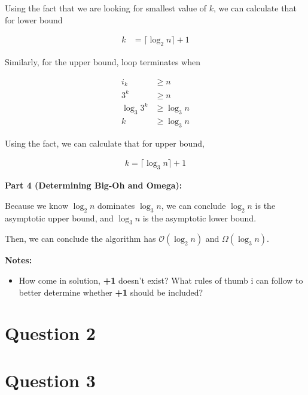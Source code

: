 \documentclass[12pt]{article}
\begin{document}
\begin{enumerate}[a.]
    \bigskip

    Using the fact that we are looking for smallest value of $k$, we can calculate that
    for lower bound

    \begin{align}
        k &= \lceil \log_2 n \rceil + 1
    \end{align}

    \bigskip

    Similarly, for the upper bound, loop terminates when

    \begin{align}
        i_k &\geq n\\
        3^k &\geq n\\
        \log_3 3^k &\geq \log_3 n\\
        k &\geq \log_3 n
    \end{align}

    \bigskip

    Using the fact, we can calculate that for upper bound,

    \begin{align}
        k = \lceil \log_3 n \rceil + 1
    \end{align}

    \textbf{Part 4 (Determining Big-Oh and Omega):}

    \bigskip

    Because we know $\log_2 n$ dominates $\log_3 n$, we can conclude
    $\log_2 n$ is the asymptotic upper bound, and $\log_3 n$ is the asymptotic lower bound.

    \bigskip

    Then, we can conclude the algorithm has $\mathcal{O}(\log_2 n)$ and $\Omega(\log_3 n)$.

    \bigskip

    \textbf{Notes:}

    \begin{itemize}
        \item How come in solution, \textbf{+1} doesn't exist? What rules of thumb
        i can follow to better determine whether \textbf{+1} should be included?
    \end{itemize}

\end{enumerate}

\section*{Question 2}

\section*{Question 3}
\end{document}
